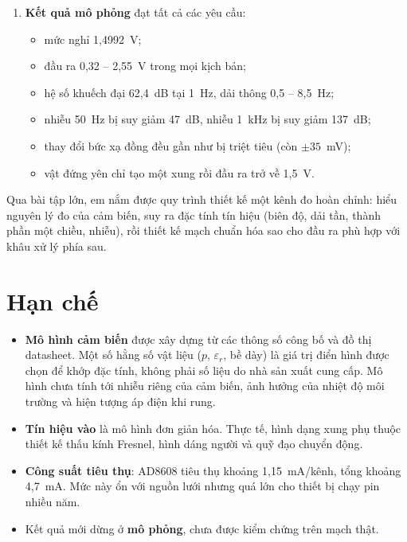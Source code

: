 \begin{enumerate}
\begin{itemize}
    \item mạch ghép AC dịch mức về $\VREF$ và tầng 2 với $K_2 = 16$;
    \item bộ lọc thông thấp Sallen-Key bậc 2, $f_0 = 10{,}7$~Hz, $Q = 0{,}74$;
    \item mạch chia áp $k = 0{,}909$ đưa dải ra về 0 -- 3~V.
  \end{itemize}
  Mọi giá trị linh kiện đều được tính từ công thức và yêu cầu cụ thể.
  \item \textbf{Kết quả mô phỏng} đạt tất cả các yêu cầu:
  \begin{itemize}
    \item mức nghỉ 1,4992~V;
    \item đầu ra 0,32 -- 2,55~V trong mọi kịch bản;
    \item hệ số khuếch đại 62,4~dB tại 1~Hz, dải thông 0,5 -- 8,5~Hz;
    \item nhiễu 50~Hz bị suy giảm 47~dB, nhiễu 1~kHz bị suy giảm 137~dB;
    \item thay đổi bức xạ đồng đều gần như bị triệt tiêu (còn $\pm 35$~mV);
    \item vật đứng yên chỉ tạo một xung rồi đầu ra trở về 1,5~V.
  \end{itemize}
\end{enumerate}

Qua bài tập lớn, em nắm được quy trình thiết kế một kênh đo hoàn chỉnh: hiểu nguyên lý đo của cảm biến, suy ra đặc tính tín hiệu (biên độ, dải tần, thành phần một chiều, nhiễu), rồi thiết kế mạch chuẩn hóa sao cho đầu ra phù hợp với khâu xử lý phía sau.

\section{Hạn chế}

\begin{itemize}
  \item \textbf{Mô hình cảm biến} được xây dựng từ các thông số công bố và đồ thị datasheet. Một số hằng số vật liệu ($p$, $\varepsilon_r$, bề dày) là giá trị điển hình được chọn để khớp đặc tính, không phải số liệu do nhà sản xuất cung cấp. Mô hình chưa tính tới nhiễu riêng của cảm biến, ảnh hưởng của nhiệt độ môi trường và hiện tượng áp điện khi rung.
  \item \textbf{Tín hiệu vào} là mô hình đơn giản hóa. Thực tế, hình dạng xung phụ thuộc thiết kế thấu kính Fresnel, hình dáng người và quỹ đạo chuyển động.
  \item \textbf{Công suất tiêu thụ}: AD8608 tiêu thụ khoảng 1,15~mA/kênh, tổng khoảng 4,7~mA. Mức này ổn với nguồn lưới nhưng quá lớn cho thiết bị chạy pin nhiều năm.
  \item Kết quả mới dừng ở \textbf{mô phỏng}, chưa được kiểm chứng trên mạch thật.
\end{itemize}

